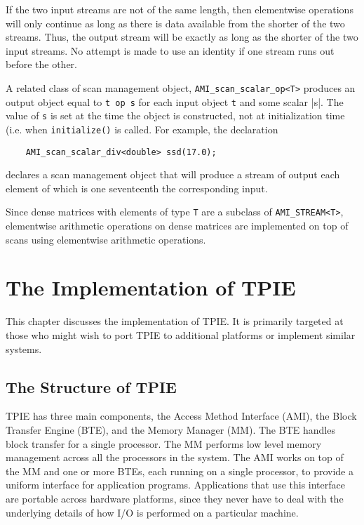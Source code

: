 If the two input streams are not of the same length, then elementwise
operations will only continue as long as there is data available from
the shorter of the two streams.  Thus, the output stream will be
exactly as long as the shorter of the two input streams.  No attempt
is made to use an identity if one stream runs out before the other.

A related class of scan management object,
\verb|AMI_scan_scalar_op<T>| produces an output object equal to
\verb|t op s| for each input object \verb|t| and some scalar |s|.
The value of \verb|s| is set at the time the object is constructed,
not at initialization time (i.e. when \verb|initialize()| is called.
For example, the declaration
\begin{verbatim}
    AMI_scan_scalar_div<double> ssd(17.0);
\end{verbatim}
declares a scan management object that will produce a stream of output
each element of which is one seventeenth the corresponding input.

Since dense matrices with elements of type \verb|T| are a subclass of
\verb|AMI_STREAM<T>|, elementwise arithmetic operations on dense
matrices are implemented on top of scans using elementwise arithmetic
operations.



\chapter{The Implementation of TPIE}

This chapter discusses the implementation of TPIE.  It is primarily
targeted at those who might wish to port TPIE to additional platforms
or implement similar systems.  

\section{The Structure of TPIE}

TPIE has three main components, the Access Method Interface
(AMI), the Block Transfer Engine
(BTE), and the Memory Manager
(MM).  The BTE handles block transfer for a single
processor.  The MM performs low level memory management across all the
processors in the system.  The AMI works on top of the MM and one or more
BTEs, each running on a single processor, to provide a uniform interface
for application programs.  Applications that use this interface are
portable across hardware platforms, since they never have to deal with the
underlying details of how I/O is performed on a particular machine.

